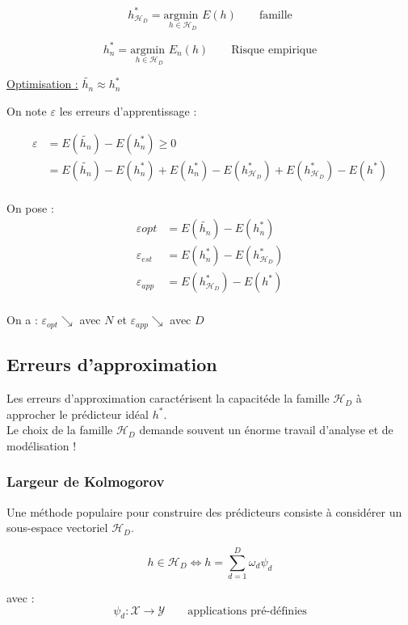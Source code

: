 \documentclass[12pt,a4paper]{article}
\begin{document}
$$
h_{\mathcal{H}_D}^* = \underset{h \in \mathcal{H}_D}{\text{argmin }} E(h) \qquad \text{famille}
$$

$$
h_{n}^* = \underset{h \in \mathcal{H}_D}{\text{argmin }} E_n(h) \qquad \text{Risque empirique}
$$

\underline{Optimisation :} $\tilde{h_n} \approx h_n^*$


On note $\varepsilon$ les erreurs d'apprentissage :

\begin{align*}
    \varepsilon &= E(\tilde{h_n}) - E(h_n^*) \geq 0\\
    &= E(\tilde{h_n}) - E(h_n^*) + E(h_n^*) - E(h_{\mathcal{H}_D}^*) + E(h_{\mathcal{H}_D}^*) - E(h^*)\\
\end{align*}

On pose :
\begin{align*}
    \varepsilon{opt} &= E(\tilde{h_n}) - E(h_n^*)\\
    \varepsilon_{est} &= E(h_n^*) - E(h_{\mathcal{H}_D}^*)\\
    \varepsilon_{app} &= E(h_{\mathcal{H}_D}^*) - E(h^*)\\
\end{align*}

On a :
$\varepsilon_{opt} \searrow$ avec $N$ et $\varepsilon_{app} \searrow$ avec $D$\\


\subsection*{Erreurs d'approximation}
Les erreurs d'approximation caractérisent la capacitéde la famille $\mathcal{H}_D$ à approcher le prédicteur idéal $h^*$.\\

Le choix de la famille $\mathcal{H}_D$ demande souvent un énorme travail d'analyse et de modélisation !

\subsubsection*{Largeur de Kolmogorov}
Une méthode populaire pour construire des prédicteurs consiste à considérer un sous-espace vectoriel $\mathcal{H}_D$.

$$
h \in \mathcal{H}_D \Leftrightarrow h = \sum_{d=1}^D \omega_d \psi_d
$$

avec :
$$
\psi_d : \mathcal{X} \rightarrow \mathcal{Y} \qquad \text{applications pré-définies}
$$
\end{document}
